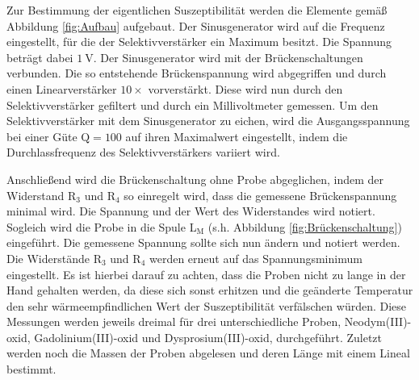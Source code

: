 Zur Bestimmung der eigentlichen Suszeptibilität werden die Elemente gemäß Abbildung \ref{fig:Aufbau} aufgebaut.
Der Sinusgenerator wird auf die Frequenz eingestellt, für die der Selektivverstärker ein Maximum besitzt.
Die Spannung beträgt dabei $\SI{1}{\volt}$.
Der Sinusgenerator wird mit der Brückenschaltungen verbunden.
Die so entstehende Brückenspannung wird abgegriffen und durch einen Linearverstärker $10\times$ vorverstärkt.
Diese wird nun durch den Selektivverstärker gefiltert und durch ein Millivoltmeter gemessen.
Um den Selektivverstärker mit dem Sinusgenerator zu eichen, wird die Ausgangsspannung bei einer Güte $\text{Q} = 100$ auf ihren Maximalwert eingestellt, indem die Durchlassfrequenz des Selektivverstärkers variiert wird.

Anschließend wird die Brückenschaltung ohne Probe abgeglichen, indem der Widerstand R$_3$ und R$_4$ so einregelt wird, dass die gemessene Brückenspannung minimal wird.
Die Spannung und der Wert des Widerstandes wird notiert.
Sogleich wird die Probe in die Spule L$_\text{M}$ (s.h. Abbildung \ref{fig:Brückenschaltung}) eingeführt.
Die gemessene Spannung sollte sich nun ändern und notiert werden.
Die Widerstände R$_3$ und R$_4$ werden erneut auf das Spannungsminimum eingestellt.
Es ist hierbei darauf zu achten, dass die Proben nicht zu lange in der Hand gehalten werden, da diese sich sonst erhitzen und die geänderte Temperatur den sehr wärmeempfindlichen Wert der Suszeptibilität verfälschen würden.
Diese Messungen werden jeweils dreimal für drei unterschiedliche Proben, Neodym(III)-oxid, Gadolinium(III)-oxid und Dysprosium(III)-oxid, durchgeführt.
Zuletzt werden noch die Massen der Proben abgelesen und deren Länge mit einem Lineal bestimmt.
